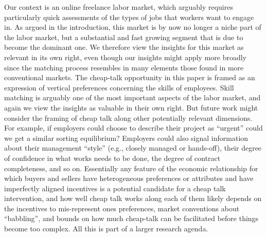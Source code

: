 \documentclass[12pt]{article}
\begin{document}
Our context is an online freelance labor market, which arguably requires particularly quick assessments of the types of jobs that workers want to engage in. As argued in the introduction, this market is by now no longer a niche part of the labor market, but a substantial and fast growing segment that is due to become the dominant one. We therefore view the insights for this market as relevant in its own right, even though our insights might apply more broadly since the matching process resembles in many elements those found in more conventional markets. The cheap-talk opportunity in this paper is framed as an expression of vertical preferences concerning the skills of employees. Skill matching is arguably one of the most important aspects of the labor market, and again we view the insights as valuable in their own right. But future work might consider the framing of cheap talk along other potentially relevant dimensions. For example, if employers could choose to describe their project as ``urgent'' could we get a similar sorting equilibrium? 
Employers could also signal information about their management ``style'' (e.g., closely managed or hands-off),  their degree of confidence in what works needs to be done, the degree of contract completeness, and so on.  
Essentially any feature of the economic relationship for which buyers and sellers have heterogeneous preferences or attributes and have imperfectly aligned incentives is a potential candidate for a cheap talk intervention, and how well cheap talk works along each of them likely depends on the incentives to mis-represent ones preferences, market conventions about ``babbling'', and bounds on how much cheap-talk can be facilitated before things become too complex. All this is part of a larger research agenda.









\singlespacing 


\end{document}
